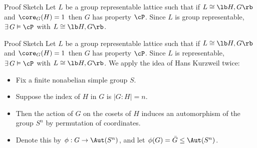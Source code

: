 \begin{frame}[label=IEPropsLemma2]{}
\alert{Proof Sketch}
\vskip2mm
  Let $L$ be a group representable lattice such that if $L\cong \lb H,G \rb$ and
  $\core_G(H)=1$ then $G$ has property $\cP$.  
\vskip4mm
  Since $L$ is group representable, $\exists\, G \vDash \cP$ with $L
  \cong \lb H,G \rb$. 
\vskip4mm
\end{frame}

\begin{frame}[label=IEPropsLemma2Alt]{}
\alert{Proof Sketch}
\vskip2mm
  Let $L$ be a group representable lattice such that if $L\cong \lb H,G \rb$ and
  $\core_G(H)=1$ then $G$ has property $\cP$.  
\vskip4mm
  Since $L$ is representable, $\exists\, G \vDash \cP$ with $L
  \cong \lb H,G \rb$. 
\vskip4mm
  We apply the idea of Hans Kurzweil twice:
  \begin{itemize}
  \item Fix a finite nonabelian simple group $S$. 
\vskip2mm
\item Suppose the index of $H$ in $G$ is $|G:H| = n$.
\vskip2mm
\item Then the action of $G$ on the cosets of $H$ induces an automorphism of the
group $S^n$ by permutation of coordinates.  
\vskip2mm
\item
Denote this by  $\phi: G \rightarrow \Aut(S^n)$, 
  and let $\phi(G) = \bar{G} \leq \Aut(S^n)$.  
  \end{itemize}
\end{frame}


